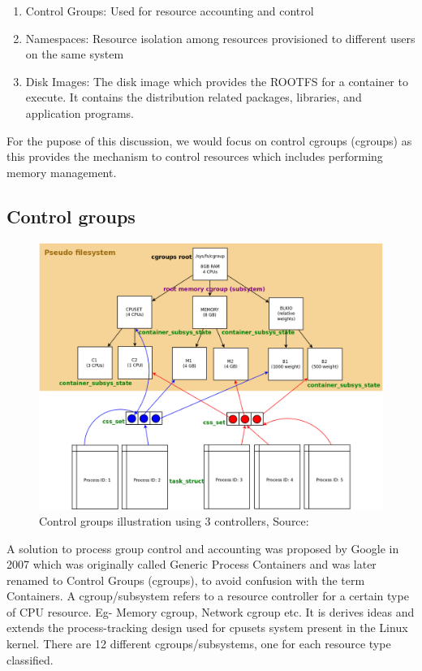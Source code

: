     \begin{enumerate}
      \item Control Groups: Used for resource accounting and control
      \item Namespaces: Resource isolation among resources provisioned to different users on the same system
      \item Disk Images: The disk image which provides the ROOTFS for a container to execute. It contains the distribution related 
packages, libraries, and application programs.
    \end{enumerate}
    
    For the pupose of this discussion, we would focus on control cgroups (cgroups) as this provides the mechanism to control resources 
which includes performing memory management.

    
    \subsection{Control groups}
      
      \begin{figure}
	\centering
	\includegraphics[width=1\textwidth]{images/cgroups.png}
	\caption{Control groups illustration using 3 controllers, Source:\cite{manual}}
	\label{img_cgroup}
      \end{figure}
      
      A solution to process group control and accounting was proposed by Google in 2007 which was originally called Generic Process 
Containers \cite{menage2007adding} and was later renamed to Control Groups (cgroups), to avoid confusion with the term Containers. A 
cgroup/subsystem refers to a resource controller for a certain type of CPU resource. Eg- Memory cgroup, Network cgroup etc. It is derives 
ideas and extends the process-tracking design used for cpusets system present in the Linux kernel. There are 12 different 
cgroups/subsystems, one for each resource type classified.

